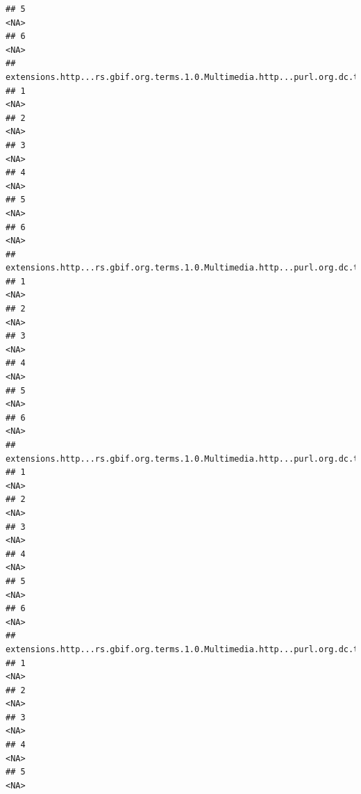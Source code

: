\documentclass[
]{book}
\begin{document}
\begin{verbatim}
## 5                                                                                  <NA>
## 6                                                                                  <NA>
##   extensions.http...rs.gbif.org.terms.1.0.Multimedia.http...purl.org.dc.terms.format.1
## 1                                                                                 <NA>
## 2                                                                                 <NA>
## 3                                                                                 <NA>
## 4                                                                                 <NA>
## 5                                                                                 <NA>
## 6                                                                                 <NA>
##   extensions.http...rs.gbif.org.terms.1.0.Multimedia.http...purl.org.dc.terms.references.1
## 1                                                                                     <NA>
## 2                                                                                     <NA>
## 3                                                                                     <NA>
## 4                                                                                     <NA>
## 5                                                                                     <NA>
## 6                                                                                     <NA>
##   extensions.http...rs.gbif.org.terms.1.0.Multimedia.http...purl.org.dc.terms.creator.1
## 1                                                                                  <NA>
## 2                                                                                  <NA>
## 3                                                                                  <NA>
## 4                                                                                  <NA>
## 5                                                                                  <NA>
## 6                                                                                  <NA>
##   extensions.http...rs.gbif.org.terms.1.0.Multimedia.http...purl.org.dc.terms.rightsHolder.2
## 1                                                                                       <NA>
## 2                                                                                       <NA>
## 3                                                                                       <NA>
## 4                                                                                       <NA>
## 5                                                                                       <NA>

\end{verbatim}
\end{document}
